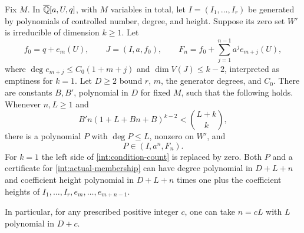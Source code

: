 \begin{lemma}\label{int:auxiliary}
Fix $M$.  In $\overline{\mathbb Q}[a,U,q]$, with $M$ variables in total, let
$I=(I_1,\ldots,I_r)$ be generated by polynomials of controlled number,
degree, and height.  Suppose its zero set $W'$ is irreducible of
dimension $k\geq1$.  Let
\[
 f_0=q+e_m(U),\qquad J=(I,a,f_0),\qquad
 F_n=f_0+\sum_{j=1}^{n-1}a^j e_{m+j}(U),
\]
where $\deg e_{m+j}\leq C_0(1+m+j)$ and
$\dim V(J)\leq k-2$, interpreted as emptiness for $k=1$.
Let $D\geq2$ bound $r$, $m$, the generator degrees, and $C_0$.
There are constants $B,B'$, polynomial in $D$ for fixed $M$, such that
the following holds.  Whenever $n,L\geq1$ and
\begin{equation}\label{int:condition-count}
 B'n(1+L+Bn+B)^{k-2}<\binom{L+k}{k},
\end{equation}
there is a polynomial $P$ with $\deg P\leq L$, nonzero on $W'$, and
\begin{equation}\label{int:actual-membership}
 P\in(I,a^n,F_n).
\end{equation}
For $k=1$ the left side of \eqref{int:condition-count} is replaced by
zero.  Both $P$ and a certificate for \eqref{int:actual-membership}
can have degree polynomial in $D+L+n$ and coefficient height
polynomial in $D+L+n$ times one plus the coefficient heights of
$I_1,\ldots,I_r,e_m,\ldots,e_{m+n-1}$.

In particular, for any prescribed positive integer $c$, one can take
$n=cL$ with $L$ polynomial in $D+c$.
\end{lemma}

